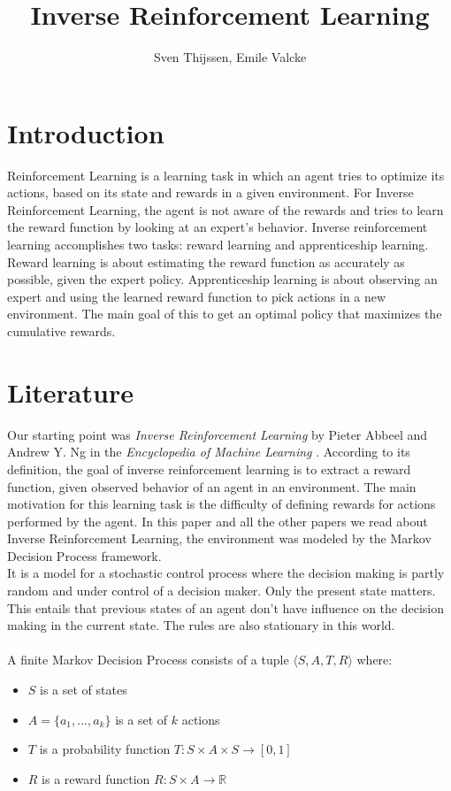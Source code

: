 \documentclass[10pt,a4paper,twocolumn]{article}
\author{Sven Thijssen, Emile Valcke}
\title{Inverse Reinforcement Learning}
\begin{document}
\maketitle

\section{Introduction}
Reinforcement Learning is a learning task in which an agent tries to optimize its actions, based on its state and rewards in a given environment. For Inverse Reinforcement Learning, the agent is not aware of the rewards and tries to learn the reward function by looking at an expert's behavior. Inverse reinforcement learning accomplishes two tasks: reward learning and apprenticeship learning. Reward learning is about estimating the reward function as accurately as possible, given the expert policy. Apprenticeship learning is about observing an expert and using the learned reward function to pick actions in a new environment. The main goal of this to get an optimal policy that maximizes the cumulative rewards.

\section{Literature}
Our starting point was \textit{Inverse Reinforcement Learning} by Pieter Abbeel and Andrew Y. Ng in the \textit{Encyclopedia of Machine Learning} \cite{sammut2011encyclopedia}. According to its definition, the goal of inverse reinforcement learning is to extract a reward function, given observed behavior of an agent in an environment. The main motivation for this learning task is the difficulty of defining rewards for actions performed by the agent. In this paper and all the other papers we read about Inverse Reinforcement Learning, the environment was modeled by the Markov Decision Process framework.\\ It is a model for a stochastic control process where the decision making is partly random and under control of a decision maker. Only the present state matters. This entails that previous states of an agent don't have influence on the decision making in the current state. The rules are also stationary in this world.\\\\

A finite Markov Decision Process consists of a tuple $\langle S,A,T,R \rangle$ where:

\begin{itemize}
\item $S$ is a set of states
\item $A = \{a_1,...,a_k\}$ is a set of $k$ actions
\item $T$ is a probability function $T: S \times A \times S \to [0,1]$
\item $R$ is a reward function $R: S \times A \to \mathbb{R}$
\end{itemize}
\end{document}
